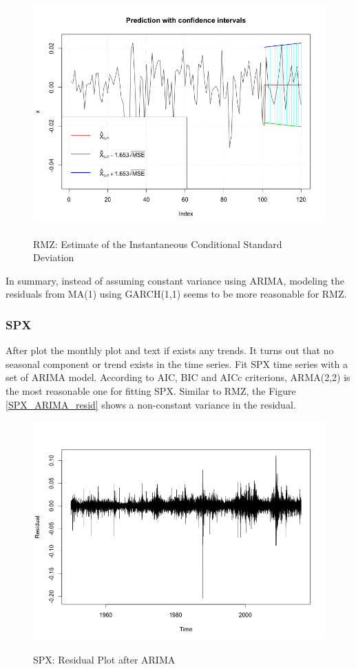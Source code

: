 \documentclass[12pt]{article}
\begin{document}
\begin{figure}
  \caption{RMZ: Estimate of the Instantaneous Conditional Standard Deviation}
  \includegraphics[width = \textwidth]{../results/RMZ_GARCH_predCI}
  \label{fig:RMZ_GARCH_predCI}
\end{figure}

In summary, instead of assuming constant variance using ARIMA, modeling the residuals from MA(1) using GARCH(1,1) seems to be more reasonable for RMZ.

\subsubsection{SPX}
After plot the monthly plot and text if exists any trends. It turns out that no seasonal component or trend exists in the time series. Fit SPX time series with a set of ARIMA model. According to AIC, BIC and AICc criterions, ARMA(2,2) is the most reasonable one for fitting SPX. Similar to RMZ, the Figure \ref{SPX_ARIMA_resid} shows a non-constant variance in the residual.

\begin{figure}
  \caption{SPX: Residual Plot after ARIMA}
  \includegraphics[width = \textwidth]{../results/SPX_ARIMA_resid}
  \label{fig:SPX_ARIMA_resid}
\end{figure}
\end{document}
